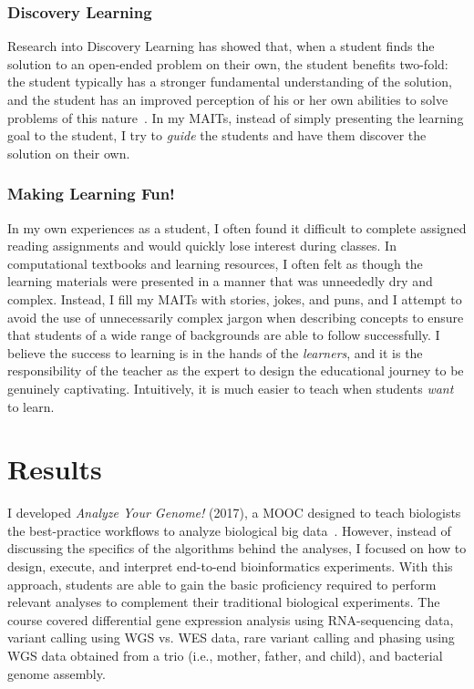 \subsubsection{Discovery Learning}
Research into Discovery Learning has showed that, when a student finds the solution to an open-ended problem on their own, the student benefits two-fold: the student typically has a stronger fundamental understanding of the solution, and the student has an improved perception of his or her own abilities to solve problems of this nature~\cite{Bruner1961}. In my \glspl{MAIT}, instead of simply presenting the learning goal to the student, I try to \textit{guide} the students and have them discover the solution on their own.

\subsubsection{Making Learning Fun!}
In my own experiences as a student, I often found it difficult to complete assigned reading assignments and would quickly lose interest during classes. In computational textbooks and learning resources, I often felt as though the learning materials were presented in a manner that was unneededly dry and complex. Instead, I fill my \glspl{MAIT} with stories, jokes, and puns, and I attempt to avoid the use of unnecessarily complex jargon when describing concepts to ensure that students of a wide range of backgrounds are able to follow successfully. I believe the success to learning is in the hands of the \textit{learners}, and it is the responsibility of the teacher as the expert to design the educational journey to be genuinely captivating. Intuitively, it is much easier to teach when students \textit{want} to learn.

\section{Results}
I developed \textit{Analyze Your Genome!} (2017), a \gls{MOOC} designed to teach biologists the best-practice workflows to analyze biological big data~\cite{Moshiri2017b}. However, instead of discussing the specifics of the algorithms behind the analyses, I focused on how to design, execute, and interpret end-to-end bioinformatics experiments. With this approach, students are able to gain the basic proficiency required to perform relevant analyses to complement their traditional biological experiments. The course covered differential gene expression analysis using \gls{RNA}-sequencing data, variant calling using \gls{WGS} vs. \gls{WES} data, rare variant calling and phasing using \gls{WGS} data obtained from a trio (i.e., mother, father, and child), and bacterial genome assembly.

